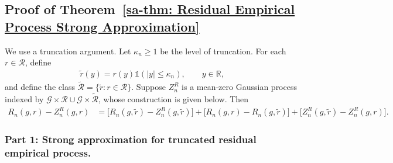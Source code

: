 \documentclass[10pt]{article}
\newcommand{\Indicator}{\mathds{1}}
\newcommand{\reals}{\mathbb{R}}
\newcommand{\G}{\mathcal{G}}
\newcommand{\R}{\mathcal{R}}
\begin{document}
\subsection{Proof of Theorem~\ref{sa-thm: Residual Empirical Process Strong Approximation}}\label{sa-sec: proof of residual empirical process strong approximation}

We use a truncation argument. Let $\kappa_n \geq 1$ be the level of truncation. For each $r \in \R$, define
\begin{align*}
    \tilde{r}(y) = r(y) \Indicator(|y| \leq \kappa_n), \qquad y \in \reals,
\end{align*}
and define the class $\tilde{\R} = \{\tilde{r}: r \in \R\}$. Suppose $Z_n^R$ is a mean-zero Gaussian process indexed by $\G \times \R \cup \G \times \tilde{\R}$, whose construction is given below. Then
\begin{align*}
    R_n(g,r) - Z_n^R(g,r)
    & = \big[R_n(g,\tilde{r}) - Z_n^R(g,\tilde{r})\big] + \big[R_n(g,r) - R_n(g,\tilde{r})\big] + \big[Z_n^R(g,\tilde{r}) - Z_n^R(g,r)\big].
\end{align*}

\subsubsection*{Part 1: Strong approximation for truncated residual empirical process.}
\end{document}
